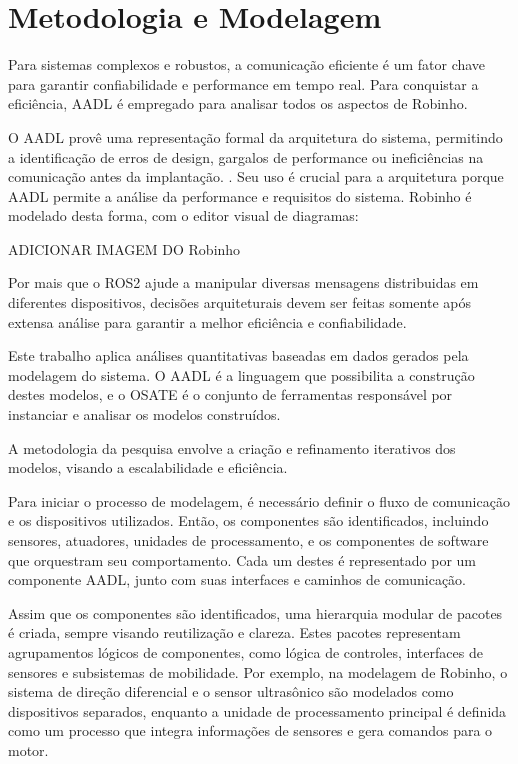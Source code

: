 \chapter{Metodologia e Modelagem}
Para sistemas complexos e robustos, a comunicação eficiente é um fator chave para garantir confiabilidade e performance em tempo real. Para conquistar a eficiência, AADL é empregado para analisar todos os aspectos de Robinho. 

O AADL provê uma representação formal da arquitetura do sistema, permitindo a identificação de erros de design, gargalos de performance ou ineficiências na comunicação antes da implantação. \cite{Santos2024}. Seu uso é crucial para a arquitetura porque AADL permite a análise da performance e requisitos do sistema. Robinho é modelado desta forma, com o editor visual de diagramas:

ADICIONAR IMAGEM DO Robinho

Por mais que o ROS2 ajude a manipular diversas mensagens distribuidas em diferentes dispositivos, decisões arquiteturais devem ser feitas somente após extensa análise para garantir a melhor eficiência e confiabilidade.

Este trabalho aplica análises quantitativas baseadas em dados gerados pela modelagem do sistema. O AADL é a linguagem que possibilita a construção destes modelos, e o OSATE é o conjunto de ferramentas responsável por instanciar e analisar os modelos construídos. 

A metodologia da pesquisa envolve a criação e refinamento iterativos dos modelos, visando a escalabilidade e eficiência. 

Para iniciar o processo de modelagem, é necessário definir o fluxo de comunicação e os dispositivos utilizados. Então, os componentes são identificados, incluindo sensores, atuadores, unidades de processamento, e os componentes de software que orquestram seu comportamento. Cada um destes é representado por um componente AADL, junto com suas interfaces e caminhos de comunicação.

Assim que os componentes são identificados, uma hierarquia modular de pacotes é criada, sempre visando reutilização e clareza. Estes pacotes representam agrupamentos lógicos de componentes, como lógica de controles, interfaces de sensores e subsistemas de mobilidade. Por exemplo, na modelagem de Robinho, o sistema de direção diferencial e o sensor ultrasônico são modelados como dispositivos separados, enquanto a unidade de processamento principal é definida como um processo que integra informações de sensores e gera comandos para o motor.

